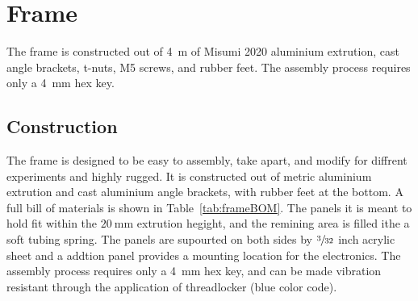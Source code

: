 \section{Frame}

The frame is constructed out of \SI{4}{\meter} of Misumi 2020 aluminium extrution, cast angle brackets, t-nuts, M5 screws, and rubber feet. The assembly process requires only a \SI{4}{\milli\meter} hex key.


\subsection{Construction}
The frame is designed to be easy to assembly, take apart, and modify for diffrent experiments and highly rugged. It is constructed out of metric aluminium extrution and cast aluminium angle brackets, with rubber feet at the bottom. A full bill of materials is shown in Table~\ref{tab:frameBOM}. The panels it is meant to hold fit within the $\SI{20}{\milli\meter}$ extrution hegight, and the remining area is filled ithe a soft tubing spring. The panels are supourted on both sides by $\sfrac{3}{32}$ inch acrylic sheet and a addtion panel provides a mounting location for the electronics. The assembly process requires only a \SI{4}{\milli\meter} hex key, and can be made vibration resistant through the application of threadlocker (blue color code). 


